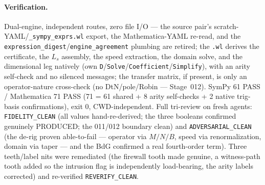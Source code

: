 \paragraph{Verification.}
Dual-engine, independent routes, zero file I/O --- the source pair's
scratch-YAML/\texttt{\_sympy\_exprs.wl} export, the Mathematica-YAML re-read, and
the \texttt{expression\_digest}/\texttt{engine\_agreement} plumbing are retired;
the \texttt{.wl} derives the certificate, the \(L_s\) assembly, the speed
extraction, the domain solve, and the dimensional leg natively (own
\texttt{D}/\texttt{Solve}/\texttt{Coefficient}/\texttt{Simplify}), with an arity
self-check and no silenced messages; the transfer matrix, if present, is only an
operator-nature cross-check (no DtN/pole/Robin --- Stage~012). SymPy 61 PASS /
Mathematica 71 PASS (71 = 61 shared + 8 arity self-checks + 2 native trig-basis
confirmations), exit 0, CWD-independent. Full tri-review on fresh agents:
\texttt{FIDELITY\_CLEAN} (all values hand-re-derived; the three booleans confirmed
genuinely PRODUCED; the 011/012 boundary clean) and \texttt{ADVERSARIAL\_CLEAN}
(the de-rig proven able-to-fail --- operator via \(M/N/B\), speed via
renormalization, domain via taper --- and the BdG confirmed a real fourth-order
term). Three teeth/label nits were remediated (the firewall tooth made genuine,
a witness-path tooth added so the intrusion flag is independently load-bearing,
the arity labels corrected) and re-verified \texttt{REVERIFY\_CLEAN}.
